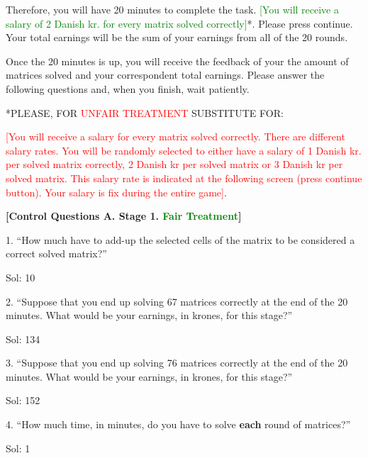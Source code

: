 \documentclass[a4paper, 12pt]{article}
\begin{document}
\begin{appendices}
Therefore, you will have 20 minutes to complete the task. \textcolor{Green}{[You will receive a salary of 2 Danish kr. for every matrix solved correctly]}*. Please press continue. Your total earnings will be the sum of your earnings from all of the 20 rounds.

Once the 20 minutes is up, you will receive the feedback of your the amount of matrices solved and your correspondent total earnings. Please answer the following questions and, when you finish, wait patiently. 

\begin{center}
*PLEASE, FOR \textcolor{Red}{UNFAIR TREATMENT} SUBSTITUTE FOR:
\end{center}
\textcolor{Red}{[You will receive a salary for every matrix solved correctly. There are different salary rates. You will be randomly selected to either have a salary of 1 Danish kr. per solved matrix correctly, 2 Danish kr per solved matrix or 3 Danish kr per solved matrix. This salary rate is indicated at the following screen (press continue button). Your salary is fix during the entire game]}.

\begin{center}
\textbf{[Control Questions A. Stage 1. \textcolor{Green}{Fair Treatment}]}
\end{center}

1. “How much have to add-up the selected cells of the matrix to be considered a correct solved matrix?”
\begin{center}
Sol: 10
\end{center}
2. “Suppose that you end up solving 67 matrices correctly at the end of the 20 minutes. What would be your earnings, in krones, for this stage?” \\
\begin{center}
Sol: 134
\end{center}
3. “Suppose that you end up solving 76 matrices correctly at the end of the 20 minutes. What would be your earnings, in krones, for this stage?” \\
\begin{center}
Sol: 152
\end{center}
4. “How much time, in minutes, do you have to solve \textbf{each} round of matrices?”
\begin{center}
Sol: 1
\end{center}


\end{appendices}
\end{document}

